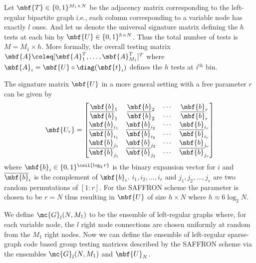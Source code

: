 \documentclass[conference,twocolumn]{IEEEtran}
\begin{document}
 Let $\mbf{T}\in\{0,1\}^{M_1\times N }$ be the adjacency matrix corresponding to the left-regular bipartite graph i.e., each column corresponding to a variable node has exactly $l$ ones. And let us denote the universal signature matrix defining the $h$ tests at each bin by $\mbf{U}\in\{0,1\}^{h\times N}$. Thus the total number of tests is $M=M_1\times h$. More formally, the overall testing matrix $\mbf{A}\coleq [\mbf{A}_{1}^{T},\ldots,\mbf{A}_{M_{1}}^{T}]^T$ where $\mbf{A}_{i}=\mbf{U}\circ \diag (\mbf{t}_i)$ defines the $h$ tests at $i^{\text{th}}$ bin.
 
 The signature matrix 	$\mbf{U}$ in a more general setting with a free parameter $r$ can be given by
 \begin{align}
\label{Eqn:SignatureMatrix}
\mbf{U_{r}}=\begin{bmatrix}
\mbf{b}_1  & \mbf{b}_2 &\cdots & \mbf{b}_r \\
\overline{\mbf{b}}_1 & \overline{\mbf{b}}_2 & \cdots & \overline{\mbf{b}}_r\\
\mbf{b}_{i_{1}} & \mbf{b}_{i_{2}} & \cdots & \mbf{b}_{i_{r}}\\
\overline{\mbf{b}}_{i_{1}} & \overline{\mbf{b}}_{i_{2}} & \cdots & \overline{\mbf{b}}_{i_{r}}\\
\mbf{b}_{j_{1}} & \mbf{b}_{j_{2}} & \cdots & \mbf{b}_{j_{r}}\\
\overline{\mbf{b}}_{j_{1}} & \overline{\mbf{b}}_{j_{2}} & \cdots & \overline{\mbf{b}}_{j_{r}}
\end{bmatrix}
\end{align}  
where $\mbf{b}_{i}\in\{0,1\}^{\ceil{\log_{2}r}}$ is the binary expansion vector for $i$ and $\overline{\mbf{b}}_{i}$ is the complement of $\mbf{b}_{i}$. $i_1,i_2,\ldots,i_r$ and $j_1,j_2,\ldots,j_r$ are two random permutations of $[1:r]$. For the SAFFRON scheme the parameter is chosen to be $r=N$ thus resulting in $\mbf{U}$ of size $h \times N$ where $h\approx 6\log_{2}N$.
\begin{definition}
We define $\mc{G}_l(N,M_1)$ to be the ensemble of left-regular graphs where, for each variable node, the $l$ right node connections are chosen uniformly at random from the $M_1$ right nodes. Now we can define the ensemble of left-regular sparse-graph code based group testing matrices described by the SAFFRON scheme via the ensembles $\mc{G}_l(N,M_1)$ and $\mbf{U}_{N}$.
\end{definition}
\end{document}

